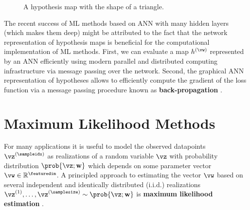 \documentclass[12pt]{report}
\begin{document}
\begin{figure}[htbp]
\begin{center}
     \vspace*{-10mm}
\end{center}
\caption{A hypothesis map with the shape of a triangle.}
\label{fig_triangle}
\end{figure}

The recent success of ML methods based on ANN with many hidden layers 
(which makes them deep) might be attributed to the fact that the network 
representation of hypothesis maps is beneficial for the computational 
implementation of ML methods. First, we can evaluate a map $h^{(\vw)}$ represented 
by an ANN efficiently using modern parallel and distributed computing 
infrastructure via message passing over the network. Second, the 
graphical ANN representation of hypotheses allows to efficiently
compute the gradient of the loss function via a message passing 
procedure known as {\bf back-propagation} \cite{Goodfellow-et-al-2016}.

\section{Maximum Likelihood Methods}
\label{sec_max_iikelihood}

For many applications it is useful to model the observed datapoints $\vz^{(\sampleidx)}$ 
as realizations of a random variable $\vz$ with probability distribution $\prob{\vz; \mathbf{w}}$ 
which depends on some parameter vector $\vw \in \mathbb{R}^{\featuredim}$. A principled 
approach to estimating the vector $\vw$ based on several independent and identically 
distributed (i.i.d.) realizations $\vz^{(1)},\ldots,\vz^{(\samplesize)}\sim \prob{\vz; \mathbf{w}}$ is 
{\bf maximum likelihood estimation} \cite{LC}. 
\end{document}
